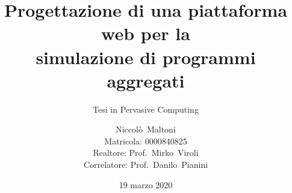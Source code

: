 \documentclass[
  usepdftitle=false,
  bigger,
  aspectratio=169,
  lualatex,
  italian
]{beamer}
\title[WebProtelis]{%
  Progettazione di una piattaforma web per la\\simulazione di programmi aggregati%
}
\subtitle{Tesi in Pervasive Computing}
\author[Niccolò~Maltoni (0000840825)]{%
  Niccolò~Maltoni%
  \\\small{Matricola: 0000840825}%
  \\\vspace{10pt} \small{Realtore: Prof.~Mirko~Viroli \\Correlatore: Prof.~Danilo~Pianini}
}
\institute[]{%
  Alma Mater Studiorum - Università di Bologna\\%
  Campus di Cesena%
}
\date{19 marzo 2020}
\begin{document}
  \frame{\titlepage}


  
  
  
  

\end{document}
